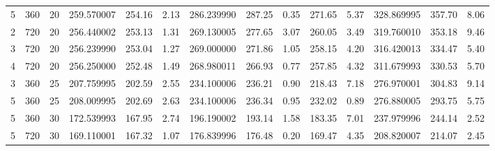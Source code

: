 \begin{tabular}{rrrrrrrrrrrrrr}
     5 &   360 &    20 &    259.570007 &     254.16 &            2.13 &     286.239990 &      287.25 &                 0.35 &         271.65 &                    5.37 &    328.869995 &     357.70 &            8.06 \\
     2 &   720 &    20 &    256.440002 &     253.13 &            1.31 &     269.130005 &      277.65 &                 3.07 &         260.05 &                    3.49 &    319.760010 &     353.18 &            9.46 \\
     3 &   720 &    20 &    256.239990 &     253.04 &            1.27 &     269.000000 &      271.86 &                 1.05 &         258.15 &                    4.20 &    316.420013 &     334.47 &            5.40 \\
     4 &   720 &    20 &    256.250000 &     252.48 &            1.49 &     268.980011 &      266.93 &                 0.77 &         257.85 &                    4.32 &    311.679993 &     330.53 &            5.70 \\
     3 &   360 &    25 &    207.759995 &     202.59 &            2.55 &     234.100006 &      236.21 &                 0.90 &         218.43 &                    7.18 &    276.970001 &     304.83 &            9.14 \\
     5 &   360 &    25 &    208.009995 &     202.69 &            2.63 &     234.100006 &      236.34 &                 0.95 &         232.02 &                    0.89 &    276.880005 &     293.75 &            5.75 \\
     5 &   360 &    30 &    172.539993 &     167.95 &            2.74 &     196.190002 &      193.14 &                 1.58 &         183.35 &                    7.01 &    237.979996 &     244.14 &            2.52 \\
     5 &   720 &    30 &    169.110001 &     167.32 &            1.07 &     176.839996 &      176.48 &                 0.20 &         169.47 &                    4.35 &    208.820007 &     214.07 &            2.45 \\
\bottomrule
\end{tabular}

